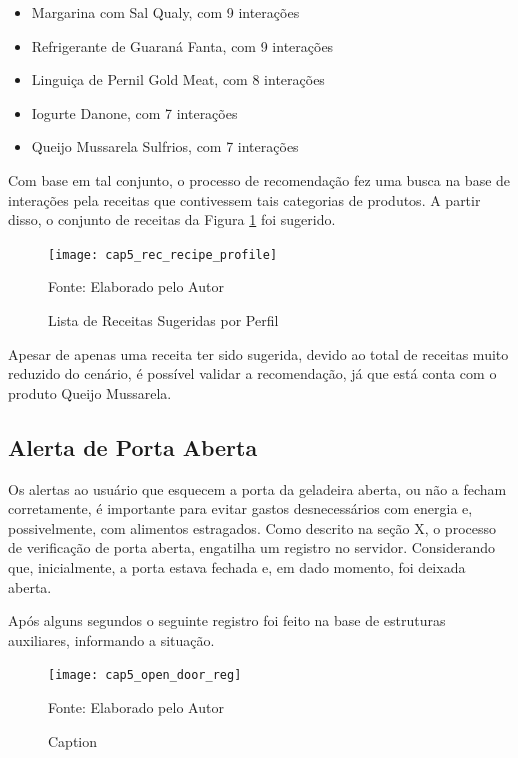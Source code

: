 \begin{itemize} \parskip -3pt
    \item Margarina com Sal Qualy, com 9 interações
    \item Refrigerante de Guaraná Fanta, com 9 interações
    \item Linguiça de Pernil Gold Meat, com 8 interações
    \item Iogurte Danone, com 7 interações
    \item Queijo Mussarela Sulfrios, com 7 interações
\end{itemize}

Com base em tal conjunto, o processo de recomendação fez uma busca na base de interações pela receitas que contivessem tais categorias de produtos. A partir disso, o conjunto de receitas da Figura \ref{fig:cap5_rec_recipe_profile} foi sugerido.



\begin{figure}[htb]
    \caption{Lista de Receitas Sugeridas por Perfil}  
    \label{fig:cap5_rec_recipe_profile}
    \texttt{[image: cap5\_rec\_recipe\_profile]}
   
    \footnotesize{Fonte: Elaborado pelo Autor}
\end{figure}

Apesar de apenas uma receita ter sido sugerida, devido ao total de receitas muito reduzido do cenário, é possível validar a recomendação, já que está conta com o produto Queijo Mussarela.

\subsection{Alerta de Porta Aberta}

Os alertas ao usuário que esquecem a porta da geladeira aberta, ou não a fecham corretamente, é importante para evitar gastos desnecessários com energia e, possivelmente, com alimentos estragados. Como descrito na seção X, o processo de verificação de porta aberta, engatilha um registro no servidor. Considerando que, inicialmente, a porta estava fechada e, em dado momento, foi deixada aberta.

Após alguns segundos o seguinte registro foi feito na base de estruturas auxiliares, informando a situação.


\begin{figure}[htb]
    \caption{Caption}
    \label{fig:cap5_open_door_reg}
    \texttt{[image: cap5\_open\_door\_reg]}
    
    \footnotesize{Fonte: Elaborado pelo Autor}
\end{figure}

